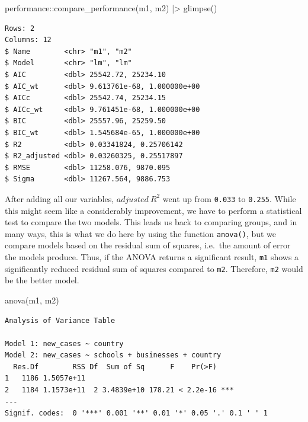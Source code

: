 \documentclass[
  letterpaper,
  DIV=11,
  numbers=noendperiod]{scrreprt}
\newenvironment{Shaded}{\begin{snugshade}}{\end{snugshade}}
\newcommand{\FunctionTok}[1]{\textcolor[rgb]{0.28,0.35,0.67}{#1}}
\newcommand{\NormalTok}[1]{\textcolor[rgb]{0.00,0.23,0.31}{#1}}
\newcommand{\SpecialCharTok}[1]{\textcolor[rgb]{0.37,0.37,0.37}{#1}}
\begin{document}
\begin{Shaded}
\begin{Highlighting}[]
\NormalTok{performance}\SpecialCharTok{::}\FunctionTok{compare\_performance}\NormalTok{(m1, m2) }\SpecialCharTok{|\textgreater{}}
  \FunctionTok{glimpse}\NormalTok{()}
\end{Highlighting}
\end{Shaded}

\begin{verbatim}
Rows: 2
Columns: 12
$ Name        <chr> "m1", "m2"
$ Model       <chr> "lm", "lm"
$ AIC         <dbl> 25542.72, 25234.10
$ AIC_wt      <dbl> 9.613761e-68, 1.000000e+00
$ AICc        <dbl> 25542.74, 25234.15
$ AICc_wt     <dbl> 9.761451e-68, 1.000000e+00
$ BIC         <dbl> 25557.96, 25259.50
$ BIC_wt      <dbl> 1.545684e-65, 1.000000e+00
$ R2          <dbl> 0.03341824, 0.25706142
$ R2_adjusted <dbl> 0.03260325, 0.25517897
$ RMSE        <dbl> 11258.076, 9870.095
$ Sigma       <dbl> 11267.564, 9886.753
\end{verbatim}

After adding all our variables, \(adjusted\ R^2\) went up from
\texttt{0.033} to \texttt{0.255}. While this might seem like a
considerably improvement, we have to perform a statistical test to
compare the two models. This leads us back to comparing groups, and in
many ways, this is what we do here by using the function
\texttt{anova()}, but we compare models based on the residual sum of
squares, i.e.~the amount of error the models produce. Thus, if the ANOVA
returns a significant result, \texttt{m1} shows a significantly reduced
residual sum of squares compared to \texttt{m2}. Therefore, \texttt{m2}
would be the better model.

\begin{Shaded}
\begin{Highlighting}[]
\FunctionTok{anova}\NormalTok{(m1, m2)}
\end{Highlighting}
\end{Shaded}

\begin{verbatim}
Analysis of Variance Table

Model 1: new_cases ~ country
Model 2: new_cases ~ schools + businesses + country
  Res.Df        RSS Df  Sum of Sq      F    Pr(>F)    
1   1186 1.5057e+11                                   
2   1184 1.1573e+11  2 3.4839e+10 178.21 < 2.2e-16 ***
---
Signif. codes:  0 '***' 0.001 '**' 0.01 '*' 0.05 '.' 0.1 ' ' 1
\end{verbatim}
\end{document}
